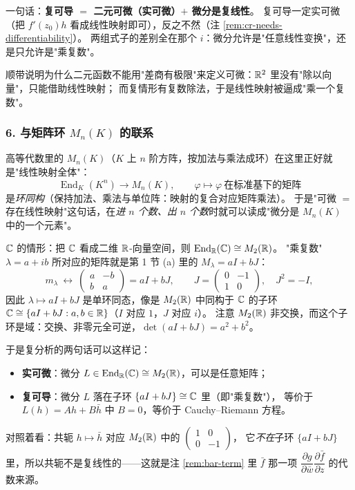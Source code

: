 \smallskip
\noindent
一句话：\textbf{复可导 $=$ 二元可微（实可微）$+$ 微分是复线性}。
复可导一定实可微（把 $f'(z_0)h$ 看成线性映射即可），反之不然（注 \ref{rem:cr-needs-differentiability}）。
两组式子的差别全在那个 $i$：微分允许是"任意线性变换"，还是只允许是"乘复数"。

\smallskip
\noindent
顺带说明为什么二元函数不能用"差商有极限"来定义可微：$\mathbb{R}^2$ 里没有"除以向量"，只能借助线性映射；
而复情形有复数除法，于是线性映射被逼成"乘一个复数"。

\subsubsection*{6. 与矩阵环 $M_n(K)$ 的联系}

高等代数里的 $M_n(K)$（$K$ 上 $n$ 阶方阵，按加法与乘法成环）在这里正好就是"线性映射全体"：
\[
\operatorname{End}_K(K^n)\longrightarrow M_n(K),\qquad \varphi\longmapsto \varphi\ \text{在标准基下的矩阵}
\]
是\emph{环同构}（保持加法、乘法与单位阵：映射的复合对应矩阵乘法）。
于是"可微 $=$ 存在线性映射"这句话，在\emph{进 $n$ 个数、出 $n$ 个数}时就可以读成"微分是 $M_n(K)$ 中的一个元素"。

$\mathbb{C}$ 的情形：把 $\mathbb{C}$ 看成二维 $\mathbb{R}$-向量空间，则 $\operatorname{End}_{\mathbb{R}}(\mathbb{C})\cong M_2(\mathbb{R})$。
"乘复数" $\lambda=a+ib$ 所对应的矩阵就是第 1 节 (a) 里的 $M_\lambda=aI+bJ$：
\[
m_\lambda\ \longleftrightarrow\ \begin{pmatrix} a & -b\\ b & a\end{pmatrix}=aI+bJ,
\qquad J=\begin{pmatrix}0&-1\\ 1&0\end{pmatrix},\quad J^2=-I,
\]
因此 $\lambda\mapsto aI+bJ$ 是单环同态，像是 $M_2(\mathbb{R})$ 中同构于 $\mathbb{C}$ 的子环
$\mathbb{C}\cong\{aI+bJ:a,b\in\mathbb{R}\}$（$I$ 对应 $1$，$J$ 对应 $i$）。
注意 $M_2(\mathbb{R})$ 非交换，而这个子环是域：交换、非零元全可逆，$\det(aI+bJ)=a^2+b^2$。

于是复分析的两句话可以这样记：
\begin{itemize}[leftmargin=1.6em]
\item \textbf{实可微}：微分 $L\in\operatorname{End}_{\mathbb{R}}(\mathbb{C})\cong M_2(\mathbb{R})$，可以是任意矩阵；
\item \textbf{复可导}：微分 $L$ 落在子环 $\{aI+bJ\}\cong\mathbb{C}$ 里（即"乘复数"），
等价于 $L(h)=Ah+B\bar h$ 中 $B=0$，等价于 Cauchy--Riemann 方程。
\end{itemize}

\noindent
对照着看：共轭 $h\mapsto\bar h$ 对应 $M_2(\mathbb{R})$ 中的 $\begin{pmatrix}1&0\\0&-1\end{pmatrix}$，
它\emph{不在}子环 $\{aI+bJ\}$ 里，所以共轭不是复线性的——这就是注 \ref{rem:bar-term} 里 $\bar f$ 那一项
$\dfrac{\partial g}{\partial\bar w}\dfrac{\partial\bar f}{\partial z}$ 的代数来源。

